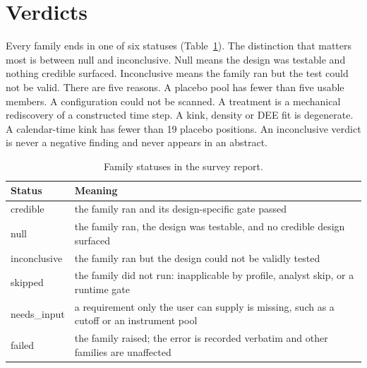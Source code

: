 \documentclass[11pt]{article}
\begin{document}
\section{Verdicts}\label{sec:verdicts}

Every family ends in one of six statuses (Table~\ref{tab:status}). The distinction that
matters most is between null and inconclusive. Null means the design was testable and
nothing credible surfaced. Inconclusive means the family ran but the test could not be valid. There are five reasons.
A placebo pool has fewer than five usable members. A configuration could not be scanned. A
treatment is a mechanical rediscovery of a constructed time step. A kink, density or DEE
fit is degenerate. A calendar-time kink has fewer than 19 placebo positions. An
inconclusive verdict is never a negative finding and never appears in an abstract.

\begin{table}[t]
\centering
\small
\caption{Family statuses in the survey report.}
\label{tab:status}
\begin{tabular}{@{}lp{10.8cm}@{}}
\toprule
Status & Meaning \\
\midrule
credible & the family ran and its design-specific gate passed \\
null & the family ran, the design was testable, and no credible design surfaced \\
inconclusive & the family ran but the design could not be validly tested \\
skipped & the family did not run: inapplicable by profile, analyst skip, or a runtime gate \\
needs\_input & a requirement only the user can supply is missing, such as a cutoff or an instrument pool \\
failed & the family raised; the error is recorded verbatim and other families are unaffected \\
\bottomrule
\end{tabular}
\end{table}
\end{document}
